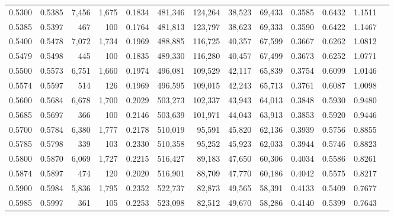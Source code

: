 \begin{tabular}{rrrrrrrrrrrrr}
0.5300 & 0.5385 &  7,456 & 1,675 &                                     0.1834 & 481,346 & 124,264 &  38,523 &  69,433 & 0.3585 & 0.6432 & 1.1511 \\
0.5385 & 0.5397 &    467 &   100 &                                     0.1764 & 481,813 & 123,797 &  38,623 &  69,333 & 0.3590 & 0.6422 & 1.1467 \\
0.5400 & 0.5478 &  7,072 & 1,734 &                                     0.1969 & 488,885 & 116,725 &  40,357 &  67,599 & 0.3667 & 0.6262 & 1.0812 \\
0.5479 & 0.5498 &    445 &   100 &                                     0.1835 & 489,330 & 116,280 &  40,457 &  67,499 & 0.3673 & 0.6252 & 1.0771 \\
0.5500 & 0.5573 &  6,751 & 1,660 &                                     0.1974 & 496,081 & 109,529 &  42,117 &  65,839 & 0.3754 & 0.6099 & 1.0146 \\
0.5574 & 0.5597 &    514 &   126 &                                     0.1969 & 496,595 & 109,015 &  42,243 &  65,713 & 0.3761 & 0.6087 & 1.0098 \\
0.5600 & 0.5684 &  6,678 & 1,700 &                                     0.2029 & 503,273 & 102,337 &  43,943 &  64,013 & 0.3848 & 0.5930 & 0.9480 \\
0.5685 & 0.5697 &    366 &   100 &                                     0.2146 & 503,639 & 101,971 &  44,043 &  63,913 & 0.3853 & 0.5920 & 0.9446 \\
0.5700 & 0.5784 &  6,380 & 1,777 &                                     0.2178 & 510,019 &  95,591 &  45,820 &  62,136 & 0.3939 & 0.5756 & 0.8855 \\
0.5785 & 0.5798 &    339 &   103 &                                     0.2330 & 510,358 &  95,252 &  45,923 &  62,033 & 0.3944 & 0.5746 & 0.8823 \\
0.5800 & 0.5870 &  6,069 & 1,727 &                                     0.2215 & 516,427 &  89,183 &  47,650 &  60,306 & 0.4034 & 0.5586 & 0.8261 \\
0.5874 & 0.5897 &    474 &   120 &                                     0.2020 & 516,901 &  88,709 &  47,770 &  60,186 & 0.4042 & 0.5575 & 0.8217 \\
0.5900 & 0.5984 &  5,836 & 1,795 &                                     0.2352 & 522,737 &  82,873 &  49,565 &  58,391 & 0.4133 & 0.5409 & 0.7677 \\
0.5985 & 0.5997 &    361 &   105 &                                     0.2253 & 523,098 &  82,512 &  49,670 &  58,286 & 0.4140 & 0.5399 & 0.7643 \\

\end{tabular}
